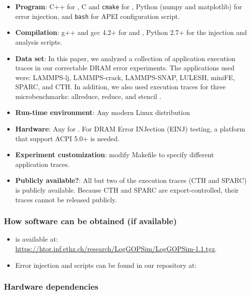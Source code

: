 {\small
\begin{itemize}
        \item {\bf Program}: C++ for \LogGOPSim, C and {\texttt{cmake}} for
                \selfish, Python (numpy and matplotlib) for error injection, and
                {\texttt{bash}} for APEI configuration script.
        \item {\bf Compilation}: g++ and gcc 4.2+ for \LogGOPSim and \selfish,
                Python 2.7+ for the injection and analysis scripts.
        \item {\bf Data set}: In this paper, we analyzed a collection of application
                execution traces in our correctable DRAM error experiments.  The
                applications used were: LAMMPS-lj, LAMMPS-crack, LAMMPS-SNAP,
                LULESH, miniFE, SPARC, and CTH.  In addition, we also used execution
                traces for three microbenchmarks: allreduce, reduce, and stencil
                .
        \item {\bf Run-time environment}: Any modern Linux distribution
        \item {\bf Hardware}: Any for \LogGOPSim.  For DRAM Error INJection
                (EINJ) testing, a platform that support ACPI 5.0+ is needed.
        \item {\bf Experiment customization}: modify Makefile to specify different
                application traces.
        \item {\bf Publicly available?}: All but two of the execution traces
                (CTH and SPARC) is publicly  available.  Because CTH and SPARC
                are export-controlled, their traces cannot be released publicly.  
\end{itemize}
}

\subsubsection{How software can be obtained (if available)}
\begin{itemize}
\item \LogGOPSim is available at:\\
    \url{https://htor.inf.ethz.ch/research/LogGOPSim/LogGOPSim-1.1.tgz}.  

\item Error injection and \selfish scripts can be found in our repository at: 
\end{itemize}

\subsubsection{Hardware dependencies}

